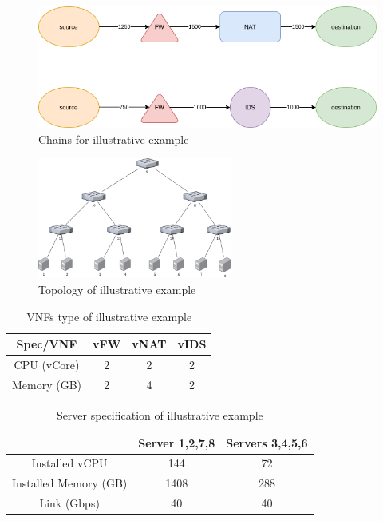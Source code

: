 \begin{figure}
    \centering
    \includegraphics[width=0.7\linewidth]{images/example-chains.png}
    \caption{Chains for illustrative example}
    \label{fig:example-chains}
\end{figure}

\begin{figure}
    \centering
    \includegraphics[height=150px]{images/example-toplogy.png}
    \caption{Topology of illustrative example}
    \label{fig:example-topology}
\end{figure}

\begin{table}
    \centering
    \caption{VNFs type of illustrative example}
    \begin{tabular}{|c|c|c|c|}
        \hline
        Spec/VNF & vFW & vNAT & vIDS \\
        \hline
        CPU (vCore) & 2 & 2 & 2 \\
        \hline
        Memory (GB) & 2 & 4 & 2 \\
        \hline
    \end{tabular}
    \label{tbl:example-vnf-types}
\end{table}

\begin{table}
    \centering
    \caption{Server specification of illustrative example}
    \begin{tabular}{|c|c|c|}
        \hline
        & Server 1,2,7,8 & Servers 3,4,5,6 \\
        \hline
        Installed vCPU & 144 & 72 \\
        \hline
        Installed Memory (GB) & 1408 & 288 \\
        \hline
        Link (Gbps) & 40 & 40 \\
        \hline
    \end{tabular}
    \label{tbl:example-server-spec}
\end{table}

